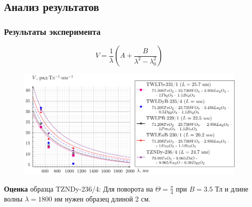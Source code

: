 \documentclass[10pt,pdf,hyperref={unicode}, dvipsnames]{beamer}
\begin{document}

\begin{frame}[t]
	\subsection{Анализ результатов}
	\frametitle{Результаты эксперимента}
	\vspace{-1em}
	\begin{equation*}
		V=\frac{1}{\lambda}\left(
		A+\frac{B}{\lambda^2-\lambda_0^2}
		\right)
	\end{equation*}
	\vspace{-1em}
	\begin{figure}[tb]
		\centering
		\includegraphics[width=1\textwidth]{images/graph_verde_from_lambda}
	\end{figure}
	
	\textbf{Оценка} образца TZNDy-236/4: Для поворота на $\Theta=\frac{\pi}{4}$ при $B=3.5$ Тл и длине волны $\lambda=1800$ нм нужен образец длиной 2 см.
	
	
	
\end{frame}

\end{document}
